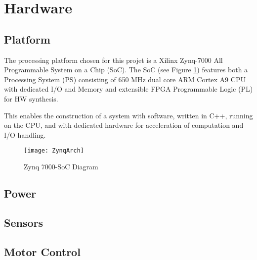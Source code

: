 \documentclass[Main]{subfiles}
\begin{document}
\section{Hardware} %
\label{sec:hardware}

	\subsection{Platform} %
	\label{sub:platform}

		The processing platform chosen for this projet is a Xilinx Zynq-7000 All Programmable System on a Chip (SoC).
		The SoC (see Figure \ref{fig:ZynqArch}) features both a Processing System (PS) consisting of 650 MHz dual core ARM\textregistered{} Cortex A9 CPU with dedicated I/O and Memory and extensible FPGA Programmable Logic (PL) for HW synthesis.

		This enables the construction of a system with software, written in C++, running on the CPU, and with dedicated hardware for acceleration of computation and I/O handling.
		\begin{figure}[H]
			\centering
			\texttt{[image: ZynqArch]}
			\caption{Zynq 7000-SoC Diagram}
			\label{fig:ZynqArch}
		\end{figure}

		
	

	\subsection{Power} %
	\label{sub:power}
	

	\subsection{Sensors} %
	\label{sub:sensor}
	

	\subsection{Motor Control} %
	\label{sub:motor_control}
	


\end{document}

